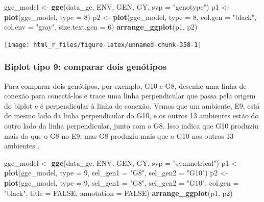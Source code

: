 \documentclass[
]{book}
\newenvironment{Shaded}{\begin{snugshade}}{\end{snugshade}}
\newcommand{\DataTypeTok}[1]{\textcolor[rgb]{0.13,0.29,0.53}{#1}}
\newcommand{\DecValTok}[1]{\textcolor[rgb]{0.00,0.00,0.81}{#1}}
\newcommand{\KeywordTok}[1]{\textcolor[rgb]{0.13,0.29,0.53}{\textbf{#1}}}
\newcommand{\NormalTok}[1]{#1}
\newcommand{\OtherTok}[1]{\textcolor[rgb]{0.56,0.35,0.01}{#1}}
\newcommand{\StringTok}[1]{\textcolor[rgb]{0.31,0.60,0.02}{#1}}
\begin{document}
\begin{Shaded}
\begin{Highlighting}[]
\NormalTok{gge_model <-}\StringTok{ }\KeywordTok{gge}\NormalTok{(data_ge, ENV, GEN, GY, }\DataTypeTok{svp =} \StringTok{"genotype"}\NormalTok{)}
\NormalTok{p1 <-}\StringTok{ }\KeywordTok{plot}\NormalTok{(gge_model, }\DataTypeTok{type =} \DecValTok{8}\NormalTok{)}
\NormalTok{p2 <-}\StringTok{ }\KeywordTok{plot}\NormalTok{(gge_model,}
           \DataTypeTok{type =} \DecValTok{8}\NormalTok{,}
           \DataTypeTok{col.gen =} \StringTok{"black"}\NormalTok{,}
           \DataTypeTok{col.env =} \StringTok{"gray"}\NormalTok{,}
           \DataTypeTok{size.text.gen =} \DecValTok{6}\NormalTok{)}
\KeywordTok{arrange_ggplot}\NormalTok{(p1, p2)}
\end{Highlighting}
\end{Shaded}

\begin{center}\texttt{[image: html\_r\_files/figure-latex/unnamed-chunk-358-1]} \end{center}

\hypertarget{biplot-tipo-9-comparar-dois-genuxf3tipos}{%
\subsubsection{Biplot tipo 9: comparar dois genótipos}\label{biplot-tipo-9-comparar-dois-genuxf3tipos}}

Para comparar dois genótipos, por exemplo, G10 e G8, desenhe uma linha de conexão para conectá-los e trace uma linha perpendicular que passa pela origem do biplot e é perpendicular à linha de conexão. Vemos que um ambiente, E9, está do mesmo lado da linha perpendicular do G10, e os outros 13 ambientes estão do outro lado da linha perpendicular, junto com o G8. Isso indica que G10 produziu mais do que o G8 no E9, mas G8 produziu mais que o G10 nos outros 13 ambientes \citep{Yan2007}.

\begin{Shaded}
\begin{Highlighting}[]
\NormalTok{gge_model <-}\StringTok{ }\KeywordTok{gge}\NormalTok{(data_ge, ENV, GEN, GY, }\DataTypeTok{svp =} \StringTok{"symmetrical"}\NormalTok{)}
\NormalTok{p1 <-}\StringTok{ }\KeywordTok{plot}\NormalTok{(gge_model, }\DataTypeTok{type =} \DecValTok{9}\NormalTok{, }\DataTypeTok{sel_gen1 =} \StringTok{"G8"}\NormalTok{, }\DataTypeTok{sel_gen2 =} \StringTok{"G10"}\NormalTok{)}
\NormalTok{p2 <-}\StringTok{ }\KeywordTok{plot}\NormalTok{(gge_model,}
           \DataTypeTok{type =} \DecValTok{9}\NormalTok{,}
           \DataTypeTok{sel_gen1 =} \StringTok{"G8"}\NormalTok{,}
           \DataTypeTok{sel_gen2 =} \StringTok{"G10"}\NormalTok{,}
           \DataTypeTok{col.gen =} \StringTok{"black"}\NormalTok{,}
           \DataTypeTok{title =} \OtherTok{FALSE}\NormalTok{,}
           \DataTypeTok{annotation =} \OtherTok{FALSE}\NormalTok{)}
\KeywordTok{arrange_ggplot}\NormalTok{(p1, p2)}
\end{Highlighting}
\end{Shaded}
\end{document}

